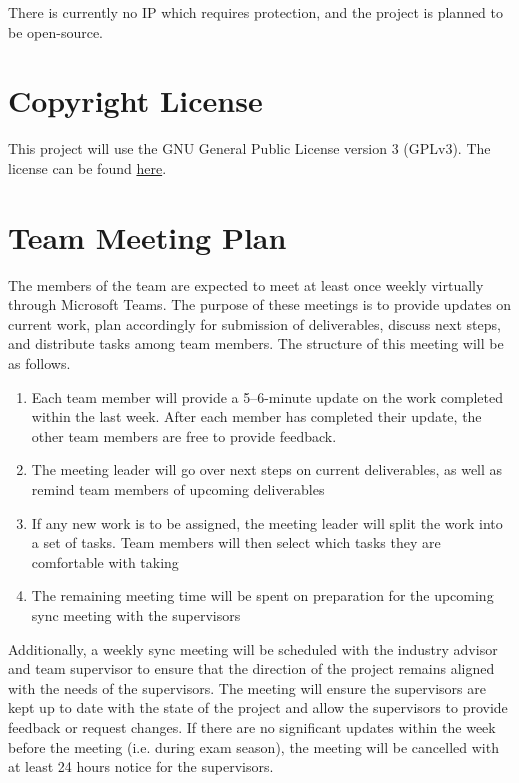 \documentclass{article}
\begin{document}
\begin{comment}
\wss{State whether there is IP to protect.  If there is, point to the agreement.
All students who are working on a project that requires an IP agreement are also
required to sign the ``Intellectual Property Guide Acknowledgement.''}
\end{comment}

There is currently no IP which requires protection, and the project is planned
to be open-source.

\section{Copyright License}

\begin{comment}
\wss{What copyright license is your team adopting.  Point to the license in your
repo.}
\end{comment}

This project will use the GNU General Public License version 3 (GPLv3). The
license can be found \href{https://github.com/VirochaanRG/MES-Event-Management-System/blob/main/LICENSE}{here}.

\section{Team Meeting Plan}
\begin{flushleft}
The members of the team are expected to meet at least once weekly virtually through Microsoft Teams. 
The purpose of these meetings is to provide updates on current work, plan accordingly for submission of deliverables, discuss next steps, and distribute tasks among team members. 
The structure of this meeting will be as follows.
  \begin{enumerate}
    \item Each team member will provide a 5–6-minute update on the work completed within the last week. After each member has completed their update, the other team members are free to provide feedback.
    \item The meeting leader will go over next steps on current deliverables, as well as remind team members of upcoming deliverables
    \item If any new work is to be assigned, the meeting leader will split the work into a set of tasks. Team members will then select which tasks they are comfortable with taking
    \item The remaining meeting time will be spent on preparation for the upcoming sync meeting with the supervisors
  \end{enumerate}
Additionally, a weekly sync meeting will be scheduled with the industry advisor and team supervisor to ensure that the direction of the project remains aligned with the needs of the supervisors. 
The meeting will ensure the supervisors are kept up to date with the state of the project and allow the supervisors to provide feedback or request changes. 
If there are no significant updates within the week before the meeting (i.e. during exam season), the meeting will be cancelled with at least 24 hours notice for the supervisors.
\end{flushleft}
\end{document}
